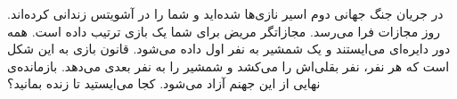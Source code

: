     \p 
در جریان جنگ جهانی دوم اسیر نازی‌ها شده‌اید و شما را در آشویتس زندانی کرده‌اند. روز مجازات فرا می‌رسد. مجازاتگر مریض برای شما یک بازی ترتیب داده است. همه دور دایره‌ای می‌ایستند و یک شمشیر به نفر اول داده می‌شود. قانون بازی به این شکل است که هر نفر، نفر بقلی‌اش را می‌کشد و شمشیر را به نفر بعدی می‌دهد. بازمانده‌ی نهایی از این جهنم آزاد می‌شود. کجا می‌ایستید تا زنده بمانید؟